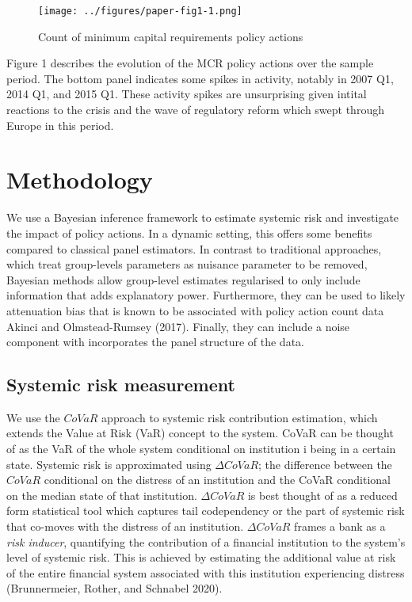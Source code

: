 \documentclass[
  10pt,
]{article}
\begin{document}
\begin{figure}
\centering
\texttt{[image: ../figures/paper-fig1-1.png]}
\caption{Count of minimum capital requirements policy actions}
\end{figure}

Figure 1 describes the evolution of the MCR policy actions over the
sample period. The bottom panel indicates some spikes in activity,
notably in 2007 Q1, 2014 Q1, and 2015 Q1. These activity spikes are
unsurprising given intital reactions to the crisis and the wave of
regulatory reform which swept through Europe in this period.

\hypertarget{meth}{%
\section{Methodology}\label{meth}}

We use a Bayesian inference framework to estimate systemic risk and
investigate the impact of policy actions. In a dynamic setting, this
offers some benefits compared to classical panel estimators. In contrast
to traditional approaches, which treat group-levels parameters as
nuisance parameter to be removed, Bayesian methods allow group-level
estimates regularised to only include information that adds explanatory
power. Furthermore, they can be used to likely attenuation bias that is
known to be associated with policy action count data Akinci and
Olmstead-Rumsey (2017). Finally, they can include a noise component with
incorporates the panel structure of the data.

\hypertarget{systemic-risk-measurement}{%
\subsection{Systemic risk measurement}\label{systemic-risk-measurement}}

We use the \(CoVaR\) approach to systemic risk contribution estimation,
which extends the Value at Risk (VaR) concept to the system. CoVaR can
be thought of as the VaR of the whole system conditional on institution
i being in a certain state. Systemic risk is approximated using
\(\Delta CoVaR\); the difference between the \(CoVaR\) conditional on
the distress of an institution and the CoVaR conditional on the median
state of that institution. \(\Delta CoVaR\) is best thought of as a
reduced form statistical tool which captures tail codependency or the
part of systemic risk that co-moves with the distress of an institution.
\(\Delta CoVaR\) frames a bank as a \emph{risk inducer}, quantifying the
contribution of a financial institution to the system's level of
systemic risk. This is achieved by estimating the additional value at
risk of the entire financial system associated with this institution
experiencing distress (Brunnermeier, Rother, and Schnabel 2020).
\end{document}
